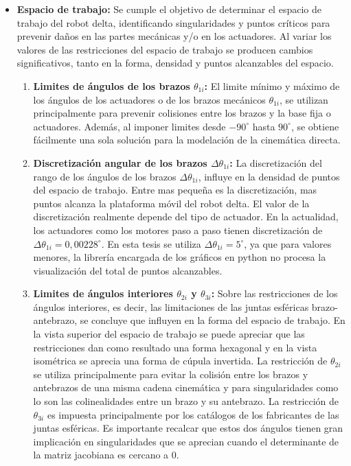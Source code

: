 \begin{itemize}
            \item {\textbf{Espacio de trabajo:} Se cumple el objetivo de determinar el espacio de trabajo del robot delta, identificando singularidades y puntos críticos  para prevenir daños en las partes mecánicas y/o en los actuadores. Al variar los valores de las restricciones del espacio de trabajo se producen cambios significativos, tanto en la forma, densidad y puntos alcanzables del espacio.
                \begin{enumerate}
                    \item  {\textbf{Limites de ángulos de los brazos  $\theta_{1i}$:  }El limite mínimo y máximo de los ángulos de los actuadores o de los brazos mecánicos $\theta_{1i}$, se utilizan principalmente para prevenir colisiones entre los brazos y la base fija o actuadores. Además, al imponer limites desde ${-90}^\circ$ hasta ${90}^\circ$, se obtiene fácilmente una sola solución para la modelación de la cinemática directa.}
                    \item {\textbf{Discretización angular de los brazos  $\Delta\theta_{1i}$:  }La discretización del rango de los ángulos de los brazos $\Delta\theta_{1i}$, influye en la densidad de puntos del espacio de trabajo. Entre mas pequeña es la discretización, mas puntos alcanza la plataforma móvil del robot delta. El valor de la discretización realmente depende del tipo de actuador. En la actualidad, los actuadores como los motores paso a paso tienen discretización  de ${\Delta\theta}_{1i}={0,00228}^{\circ}$. En esta tesis se utiliza  ${\Delta\theta}_{1i}={5}^{\circ}$, ya que para valores menores, la librería encargada de los gráficos en python no procesa la visualización del total de puntos alcanzables.} 
                    \item{\textbf{Limites de ángulos interiores $\theta_{2i}$ y $\theta_{3i}$:  }Sobre las restricciones de los ángulos interiores, es decir, las limitaciones de las juntas esféricas brazo-antebrazo, se concluye que influyen en la forma del espacio de trabajo. En la vista superior del espacio de trabajo se puede apreciar que las restricciones dan como resultado una forma hexagonal y en la vista isométrica se aprecia una forma de cúpula invertida. La restricción de $\theta_{2i}$ se utiliza principalmente para evitar la colisión entre los brazos y antebrazos de una misma cadena cinemática y para singularidades como lo son las colinealidades entre un brazo y su antebrazo. La restricción de $\theta_{3i}$ es impuesta principalmente por los catálogos de los fabricantes de las juntas esféricas.  Es importante recalcar que estos dos ángulos tienen gran implicación en singularidades que se aprecian cuando el determinante de la matriz jacobiana es cercano a 0.}

\end{enumerate}}
\end{itemize}
